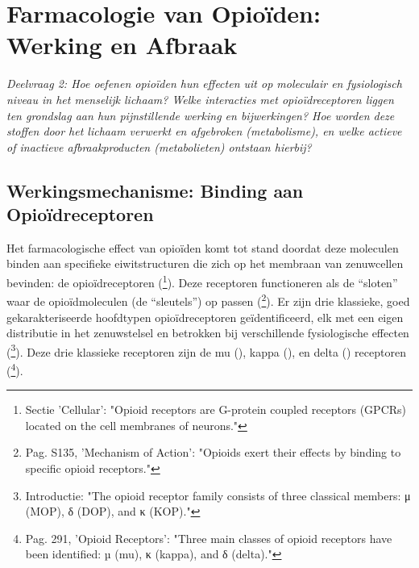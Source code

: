 \documentclass[11pt, a4paper]{report} %
\begin{document}
\chapter{Farmacologie van Opioïden: Werking en Afbraak}
\label{ch:farmacologie}
\textit{Deelvraag 2: Hoe oefenen opioïden hun effecten uit op moleculair en fysiologisch niveau in het menselijk lichaam? Welke interacties met opioïdreceptoren liggen ten grondslag aan hun pijnstillende werking en bijwerkingen? Hoe worden deze stoffen door het lichaam verwerkt en afgebroken (metabolisme), en welke actieve of inactieve afbraakproducten (metabolieten) ontstaan hierbij?}

\section{Werkingsmechanisme: Binding aan Opioïdreceptoren}
Het farmacologische effect van opioïden komt tot stand doordat deze moleculen binden aan specifieke eiwitstructuren die zich op het membraan van zenuwcellen bevinden: de opioïdreceptoren (\cite{StatPearlsOpioidReceptor}\footnote{Sectie 'Cellular': "Opioid receptors are G-protein coupled receptors (GPCRs) located on the cell membranes of neurons."}). Deze receptoren functioneren als de \enquote{sloten} waar de opioïdmoleculen (de \enquote{sleutels}) op passen (\cite{Trescot2008OpioidPharm}\footnote{Pag. S135, 'Mechanism of Action': "Opioids exert their effects by binding to specific opioid receptors."}). Er zijn drie klassieke, goed gekarakteriseerde hoofdtypen opioïdreceptoren geïdentificeerd, elk met een eigen distributie in het zenuwstelsel en betrokken bij verschillende fysiologische effecten (\cite{IUPHAROpioidReceptors}\footnote{Introductie: "The opioid receptor family consists of three classical members: μ (MOP), δ (DOP), and κ (KOP)."}). Deze drie klassieke receptoren zijn de mu (\textmu), kappa (\textkappa), en delta (\textdelta) receptoren (\cite{Gupta2010ChemistryOpioids}\footnote{Pag. 291, 'Opioid Receptors': "Three main classes of opioid receptors have been identified: µ (mu), κ (kappa), and δ (delta)."}).
\end{document}
